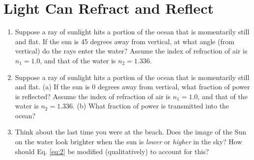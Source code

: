 \documentclass{article}
\begin{document}
\section{Light Can Refract and Reflect}

\begin{enumerate}
\item Suppose a ray of sunlight hits a portion of the ocean that is momentarily still and flat.  If the sun is 45 degrees away from vertical, at what angle (from vertical) do the rays enter the water?  Assume the index of refraction of air is $n_1 = 1.0$, and that of the water is $n_2 = 1.336$. \\ \vspace{3cm}
\item Suppose a ray of sunlight hits a portion of the ocean that is momentarily still and flat.  (a) If the sun is 0 degrees away from vertical, what fraction of power is reflected?  Assume the index of refraction of air is $n_1 = 1.0$, and that of the water is $n_2 = 1.336$. (b) What fraction of power is transmitted into the ocean? \\ \vspace{3cm}
\item Think about the last time you were at the beach.  Does the image of the Sun on the water look brighter when the sun is \textit{lower} or \textit{higher} in the sky?  How should Eq. \ref{eq:2} be modified (qualitatively) to account for this? \\ \vspace{2cm}
\end{enumerate}
\end{document}
